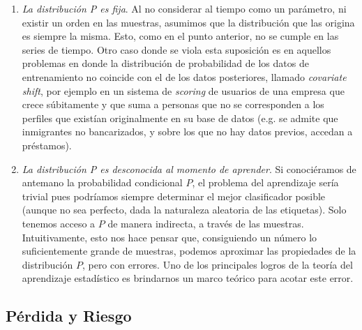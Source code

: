 \documentclass{report}
\begin{document}
\begin{enumerate}
    hay ramas muy importantes de la disciplina en donde esto no se cumple, por ejemplo en el análisis de series de tiempo, en donde
    la secuencialidad de los datos viola la condición de iid (cada valor depende en alguna medida de los anteriores). Esto es también
    cierto para las aplicaciones a lenguaje natural, y constituye una de las razones principales por las cuales esta rama más moderna
    del aprendizaje tiene bases teóricas menos fuertes que el aprendizaje automático tradicional.
    \item \textit{La distribución P es fija}. Al no considerar al tiempo como un parámetro, ni existir un orden en las muestras, asumimos
    que la distribución que las origina es siempre la misma. Esto, como en el punto anterior, no se cumple en las series de tiempo. Otro
    caso donde se viola esta suposición es en aquellos problemas en donde la distribución de probabilidad de los datos de entrenamiento no
    coincide con el de los datos posteriores, llamado \textit{covariate shift}, por ejemplo en un sistema de \textit{scoring} de usuarios
    de una empresa que crece súbitamente y que suma a personas que no se corresponden a los perfiles que existían originalmente en su base
    de datos (e.g. se admite que inmigrantes no bancarizados, y sobre los que no hay datos previos, accedan a préstamos).
    \item \textit{La distribución P es desconocida al momento de aprender}. Si conociéramos de antemano la probabilidad condicional $P$,
    el problema del aprendizaje sería trivial pues podríamos siempre determinar el mejor clasificador posible (aunque no sea perfecto,
    dada la naturaleza aleatoria de las etiquetas). Solo tenemos acceso a $P$ de manera indirecta, a través de las muestras. Intuitivamente,
    esto nos hace pensar que, consiguiendo un número lo suficientemente grande de muestras, podemos aproximar las propiedades de la distribución
    $P$, pero con errores. Uno de los principales logros de la teoría del aprendizaje estadístico es brindarnos un marco teórico para
    acotar este error.
\end{enumerate}

\subsection{Pérdida y Riesgo}
\end{document}
